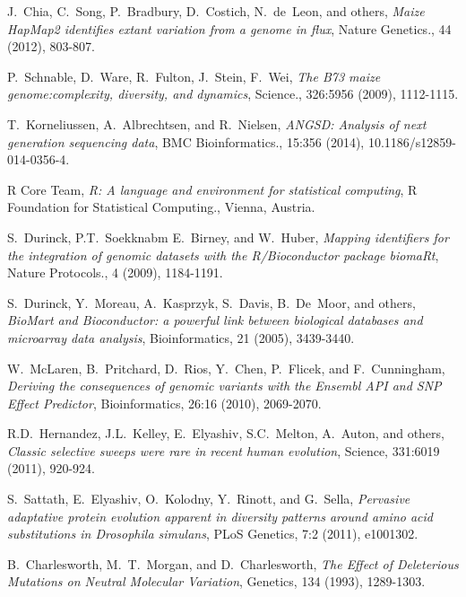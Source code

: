 \documentclass{pnastwo}
\begin{document}
\begin{article}
\begin{thebibliography}{10}
J.~Chia, C.~Song, P.~Bradbury, D.~Costich, N.~de~Leon, and others,
\emph{Maize HapMap2 identifies extant variation from a genome in
  flux}, Nature Genetics., 44 (2012), 803-807.

P.~Schnable, D.~Ware, R.~Fulton, J.~Stein, F.~Wei, \emph{The B73 maize
genome:complexity, diversity, and dynamics}, Science., 326:5956
(2009), 1112-1115.

T.~Korneliussen, A.~Albrechtsen, and R.~Nielsen, \emph{ANGSD: Analysis of
next generation sequencing data}, BMC Bioinformatics., 15:356 (2014),
10.1186/s12859-014-0356-4.

R Core Team, \emph{R: A language and environment for statistical
  computing}, R Foundation for Statistical Computing., Vienna,
Austria.

S.~Durinck, P.T.~Soekknabm E.~Birney, and W.~Huber, \emph{Mapping
  identifiers for the integration of genomic datasets with the
  R/Bioconductor package biomaRt}, Nature Protocols., 4 (2009),
1184-1191.

S.~Durinck, Y.~Moreau, A.~Kasprzyk, S.~Davis, B.~De~Moor, and others,
\emph{BioMart and Bioconductor: a powerful link between biological
  databases and microarray data analysis}, Bioinformatics, 21 (2005),
3439-3440.

W.~McLaren, B.~Pritchard, D.~Rios, Y.~Chen, P.~Flicek, and
F.~Cunningham, \emph{Deriving the consequences of genomic variants
  with the Ensembl API and SNP Effect Predictor}, Bioinformatics,
26:16 (2010), 2069-2070.

R.D.~Hernandez, J.L.~Kelley, E.~Elyashiv, S.C.~Melton, A.~Auton, and
others, \emph{Classic selective sweeps were rare in recent human
  evolution}, Science, 331:6019 (2011), 920-924.

S.~Sattath, E.~Elyashiv, O.~Kolodny, Y.~Rinott, and G.~Sella,
\emph{Pervasive adaptative protein evolution apparent in diversity
  patterns around amino acid substitutions in Drosophila simulans},
PLoS Genetics, 7:2 (2011), e1001302.

B.~Charlesworth, M.~T.~Morgan, and D.~Charlesworth, \emph{The Effect
  of Deleterious Mutations on Neutral Molecular Variation}, Genetics,
134 (1993), 1289-1303.

\end{thebibliography}
\end{article}
\end{document}
